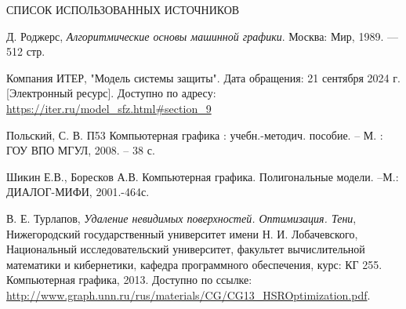 \begin{center}
    \MakeUppercase{\large Список использованных источников}
\end{center}

\renewcommand{\refname}{}
\vspace{-11mm}

\begin{thebibliography}{9}
    
Д. Роджерс, \textit{Алгоритмические основы машинной графики}. Москва: Мир, 1989. --- 512 стр.

Компания ИТЕР, "Модель системы защиты". Дата обращения: 21 сентября 2024 г. [Электронный ресурс]. Доступно по адресу: \url{https://iter.ru/model_sfz.html#section_9}

Польский, С. В.
П53 Компьютерная графика : учебн.-методич. пособие. – М. : ГОУ
ВПО МГУЛ, 2008. – 38 с.

Шикин Е.В., Боресков А.В. Компьютерная графика. Полигональные модели. –М.:
ДИАЛОГ-МИФИ, 2001.-464с.

В. Е. Турлапов, \emph{Удаление невидимых поверхностей. Оптимизация. Тени}, Нижегородский государственный университет имени Н. И. Лобачевского, Национальный исследовательский университет, факультет вычислительной математики и кибернетики, кафедра программного обеспечения, курс: КГ 255. Компьютерная графика, 2013. Доступно по ссылке: \url{http://www.graph.unn.ru/rus/materials/CG/CG13_HSROptimization.pdf}.

    
\end{thebibliography}